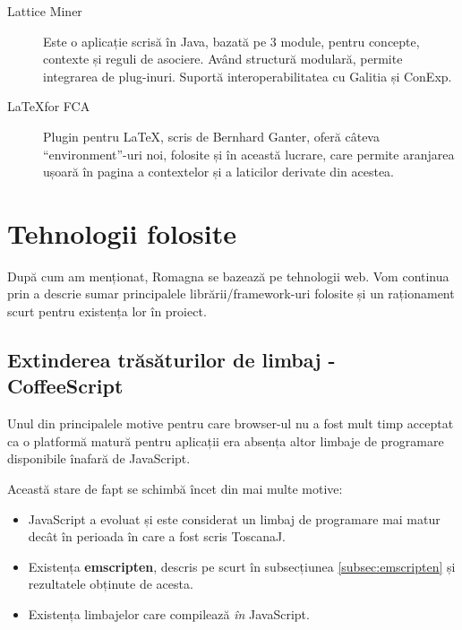\documentclass[12pt, a4paper, twoside, romanian]{teza-upb}
\begin{document}
\begin{description}
        \item[Lattice Miner] Este o aplicație scrisă în Java, bazată pe 3 module, pentru concepte, contexte și reguli de asociere. Având structură modulară, permite integrarea de plug-inuri. Suportă interoperabilitatea cu Galitia și ConExp.
      \item[\LaTeX for FCA] \cite{LatexForFCA:homepage} Plugin pentru \LaTeX, scris de Bernhard Ganter, oferă câteva ``environment''-uri noi, folosite și în această lucrare, care permite aranjarea ușoară în pagina a contextelor și a laticilor derivate din acestea.
    \end{description}

\chapter{Tehnologii folosite}
\label{sec:tehnlogii}

  După cum am menționat, Romagna se bazează pe tehnologii web. Vom continua prin a descrie sumar principalele librării/framework-uri folosite și un raționament scurt pentru existența lor în proiect.

  \section{Extinderea trăsăturilor de limbaj - CoffeeScript}
    Unul din principalele motive pentru care browser-ul nu a fost mult timp acceptat ca o platformă matură pentru aplicații era absența altor limbaje de programare disponibile înafară de JavaScript.

    Această stare de fapt se schimbă încet din mai multe motive:
    \begin{itemize}
      \item JavaScript a evoluat și este considerat un limbaj de programare mai matur decât în perioada în care a fost scris ToscanaJ.
      \item Existența \textbf{emscripten}, descris pe scurt în subsecțiunea \ref{subsec:emscripten} și rezultatele obținute de acesta.
      \item Existența limbajelor care compilează \textit{în} JavaScript.
    \end{itemize}
\end{document}
